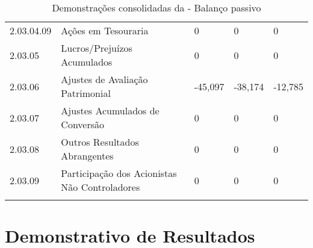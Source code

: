 \begin{center}
\begin{longtable}{p{}|p{}|p{}|p{}|p{}}
2.03.04.09 & Ações em Tesouraria & 0 & 0 & 0\tabularnewline
2.03.05 & Lucros/Prejuízos Acumulados & 0 & 0 & 0\tabularnewline
2.03.06 & Ajustes de Avaliação Patrimonial & -45,097 & -38,174 & -12,785\tabularnewline
2.03.07 & Ajustes Acumulados de Conversão & 0 & 0 & 0\tabularnewline
2.03.08 & Outros Resultados Abrangentes & 0 & 0 & 0\tabularnewline
2.03.09 & Participação dos Acionistas Não Controladores & 0 & 0 & 0\tabularnewline
\hline
\caption{Demonstrações consolidadas da \nomeCompletoPositivo{} - Balanço passivo}
\end{longtable}
\vspace*{-40pt}
\par\end{center}

\section{Demonstrativo de Resultados}

